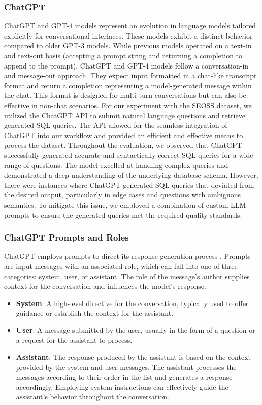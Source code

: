 \subsubsection{ChatGPT}

ChatGPT and GPT-4 models represent an evolution in language models tailored explicitly for conversational interfaces. These models exhibit a distinct behavior compared to older GPT-3 models. While previous models operated on a text-in and text-out basis (accepting a prompt string and returning a completion to append to the prompt), ChatGPT and GPT-4 models follow a conversation-in and message-out approach. They expect input formatted in a chat-like transcript format and return a completion representing a model-generated message within the chat. This format is designed for multi-turn conversations but can also be effective in non-chat scenarios.
For our experiment with the SEOSS dataset, we utilized the ChatGPT API to submit natural language questions and retrieve generated SQL queries. The API allowed for the seamless integration of ChatGPT into our workflow and provided an efficient and effective means to process the dataset.
Throughout the evaluation, we observed that ChatGPT successfully generated accurate and syntactically correct SQL queries for a wide range of questions. The model excelled at handling complex queries and demonstrated a deep understanding of the underlying database schema.
However, there were instances where ChatGPT generated SQL queries that deviated from the desired output, particularly in edge cases and questions with ambiguous semantics. To mitigate this issue, we employed a combination of custom LLM prompts to ensure the generated queries met the required quality standards.

\subsubsection{ChatGPT Prompts and Roles}

ChatGPT employs prompts to direct its response generation process \cite{white2023prompt}. Prompts are input messages with an associated role, which can fall into one of three categories: system, user, or assistant. The role of the message's author supplies context for the conversation and influences the model's response.
\begin{itemize}
    \item \textbf{System}: A high-level directive for the conversation, typically used to offer guidance or establish the context for the assistant.
    \item \textbf{User}: A message submitted by the user, usually in the form of a question or a request for the assistant to process.
    \item \textbf{Assistant}: The response produced by the assistant is based on the context provided by the system and user messages. The assistant processes the messages according to their order in the list and generates a response accordingly. Employing system instructions can effectively guide the assistant's behavior throughout the conversation.
\end{itemize}

